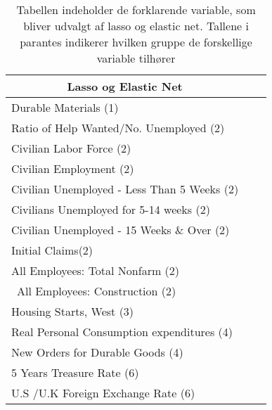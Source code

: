  \begin{table}
\small
\center
\begin{tabular}{lcc}
\toprule
\multicolumn{1}{c}{Lasso og Elastic Net}  \\ \midrule
Durable Materials (1)    \\
Ratio of Help Wanted/No. Unemployed (2) \\
Civilian Labor Force (2)   \\
Civilian Employment  (2)  \\
Civilian Unemployed - Less Than 5 Weeks (2)   \\
Civilians Unemployed for 5-14 weeks (2)  \\
Civilian Unemployed - 15 Weeks \& Over (2)  \\
Initial Claims(2)   \\ 
All Employees: Total Nonfarm (2)  \\\
All Employees: Construction (2)  \\
Housing Starts, West (3) \\
Real Personal Consumption expenditures (4) \\
New Orders for Durable Goods (4)  \\
5 Years Treasure Rate (6)  \\
U.S /U.K Foreign Exchange Rate  (6) \\  \bottomrule 
\end{tabular}
\caption{Tabellen indeholder de forklarende variable, som bliver udvalgt af lasso og elastic net. Tallene i parantes indikerer hvilken gruppe de forskellige variable tilhører} \label{tab: lasso_ud}
\end{table}
